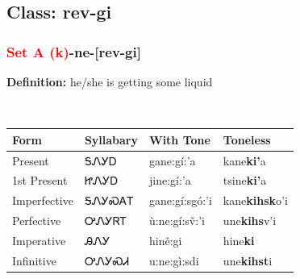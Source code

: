 \subsection*{Class: rev-gi}
\nopagebreak
\needspace{2in}
\subsubsection*{\textcolor{Red}{Set A (k)}{-}\textbf{ne}{-}[rev-gi]}
\nopagebreak
\textbf{Definition: } he/she is getting some liquid
\\[0.5em]
\begin{tabularx}{\textwidth}{l X X X}%
\toprule%
\textbf{Form}&\textbf{Syllabary}&\textbf{With Tone}&\textbf{Toneless}\\%
\midrule%
Present&ᎦᏁᎩᎠ&gane:gí:’a&kane\textbf{ki'}a\\%
1st Present&ᏥᏁᎩᎠ&jine:gí:’a&tsine\textbf{ki'}a\\%
Imperfective&ᎦᏁᎩᏍᎪᎢ&gane:gí:sgó:’i&kane\textbf{kihsk}o'i\\%
Perfective&ᎤᏁᎩᏒᎢ&ù:ne:gí:sv̌:’i&une\textbf{kihs}v'i\\%
Imperative&ᎯᏁᎩ&hině:gi&hine\textbf{ki}\\%
Infinitive&ᎤᏁᎩᏍᏗ&u:ne:gì:sdi&une\textbf{kihst}i\\%
\bottomrule%
\end{tabularx}
\\[1em]